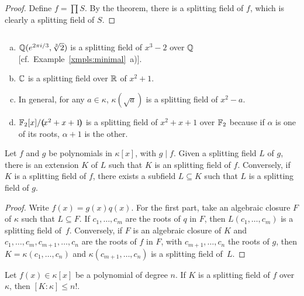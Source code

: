 \begin{proof}
    Define $f=\prod S$. By the theorem, there is a splitting field of $f$, which is clearly a splitting field of $S$.
\end{proof}

\begin{xmpls}${}$
    \begin{enumerate}[a), font=\upshape]
        \item $\mathbb{Q}(e^{2\pi i/3},\sqrt[3]2)$ is a splitting field of $x^3-2$ over $\mathbb{Q}$ [cf.~Example~\ref{xmpls:minimal}~a)].

        \item $\mathbb{C}$ is a splitting field over $\mathbb{R}$ of $x^2+1$.

        \item In general, for any $a\in\kappa$, $\kappa(\sqrt a)$ is a splitting field of $x^2-a$.

        \item $\mathbb F_2[x]/\textrm{\boldmath$($}\!x^2+x+1\!\textrm{\boldmath$)$}$ is a splitting field of $x^2+x+1$ over $\mathbb F_2$ because if $\alpha$ is one of its roots, $\alpha+1$ is the other.
    \end{enumerate}
\end{xmpls}

\begin{prop}\label{prop:splitting-field-extension}
    Let\/ $f$ and\/ $g$ be polynomials in\/ $\kappa[x]$, with\/ $g\mid f$. Given a splitting field\/ $L$ of\/ $g$, there is an extension\/ $K$ of\/ $L$ such that\/ $K$ is an splitting field of\/ $f$. Conversely, if\/ $K$ is a splitting field of\/ $f$, there exists a subfield\/ $L\subseteq K$ such that\/ $L$ is a splitting field of\/ $g$.
\end{prop}

\begin{proof}
    Write $f(x)=g(x)q(x)$. For the first part, take an algebraic closure $F$ of $\kappa$ such that $L\subseteq F$. If $c_1,\dots,c_m$ are the roots of $q$ in $F$, then $L(c_1,\dots,c_m)$ is a splitting field of~$f$. Conversely, if $F$ is an algebraic closure of $K$ and $c_1,\dots, c_m, c_{m+1},\dots,c_n$ are the roots of $f$ in $F$, with $c_{m+1},\dots,c_n$ the roots of $g$, then $K=\kappa(c_1,\dots,c_n)$ and $\kappa(c_{m+1},\dots,c_n)$ is a splitting field of~$L$.
    
\end{proof}

\begin{prop}\label{prop:splitting-field-n!}
    Let\/ $f(x) \in \kappa[x]$ be a polynomial of degree\/ $n$. If\/ $K$ is a splitting field of\/ $f$ over\/ $\kappa$, then\/ $[K : \kappa] \leq n!$.
\end{prop}

